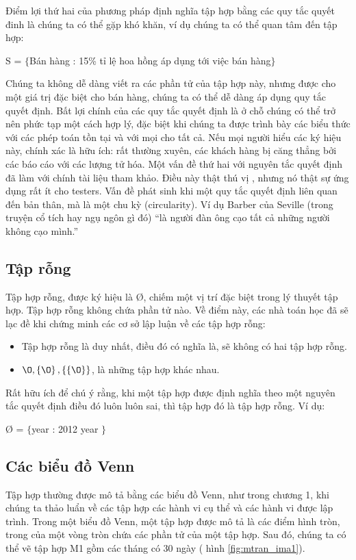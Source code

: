 \documentclass[11pt,a4paper,oneside]{article}
\begin{document}
Điểm lợi thứ hai của phương pháp định nghĩa tập hợp bằng các quy tắc quyết đinh là chúng ta có thể gặp khó khăn, ví dụ chúng ta có thể quan tâm đến tập hợp:
\begin{center}
S = $\{$Bán hàng : 15\% tỉ lệ hoa hồng áp dụng tới việc bán hàng$\}$\\
\end{center}
Chúng ta không dễ dàng viết ra các phần tử của tập hợp này, nhưng được cho một giá trị đặc biệt cho bán hàng, chúng ta có thể dễ dàng áp dụng quy tắc quyết định. Bất lợi chính của các quy tắc quyết định là ở chỗ chúng có thể trở nên phức tạp một cách hợp lý, đặc biệt khi chúng ta được trình bày các biểu thức với các phép toán tồn tại và với mọi cho tất cả. Nếu mọi người hiểu các ký hiệu này, chính xác là hữu ích: rất thường xuyên, các khách hàng bị căng thẳng bởi các báo cáo với các lượng tử hóa. Một vấn đề thứ hai với nguyên tắc quyết định đã làm với chính tài liệu tham khảo. Điều này thật thú vị , nhưng nó thật sự ứng dụng rất ít cho testers. Vấn đề phát sinh khi một quy tắc quyết định liên quan đến bản thân, mà là một chu kỳ (circularity). Ví dụ Barber của Seville (trong truyện cổ tích hay ngụ ngôn gì đó) “là người đàn ông cạo tất cả những người không cạo mình.”

\subsection{Tập rỗng}
Tập hợp rỗng, được ký hiệu là {\O}, chiếm một vị trí đặc biệt trong lý thuyết tập hợp. Tập hợp rỗng không chứa phần tử nào. Về điểm này, các nhà toán học đã sẽ lạc đề khi chứng minh các cơ sở lập luận về các tập hợp rỗng:
\begin{itemize}
\item Tập hợp rỗng là duy nhất, điều đó có nghĩa là, sẽ không có hai tập hợp rỗng.
\item ${\O}, \left\{{\O}\right\}, \left\{\left\{{\O}\right\}\right\}$,  là những tập hợp khác nhau.  \\
\end{itemize}
Rất hữu ích để chú ý rằng, khi một tập hợp được định nghĩa theo một nguyên tắc quyết định điều đó  luôn luôn sai, thì tập hợp đó là tập hợp rỗng. Ví dụ:
\begin{center}
{\O} = $\{$year :  2012 \leq year $\}$\\
\end{center}

\subsection{Các biểu đồ Venn}
Tập hợp thường được mô tả bằng các biểu đồ Venn, như trong chương 1, khi chúng ta thảo luẩn về các tập hợp các hành vi cụ thể và các hành vi được lập trình. Trong một biểu đồ Venn, một tập hợp được mô tả là các điểm hình tròn, trong của một vòng tròn chứa các phần tử của một tập hợp. Sau đó, chúng ta có thể vẽ tập hợp M1 gồm các tháng có 30 ngày ( hình \ref{fig:mtran_ima1}).
\end{document}

